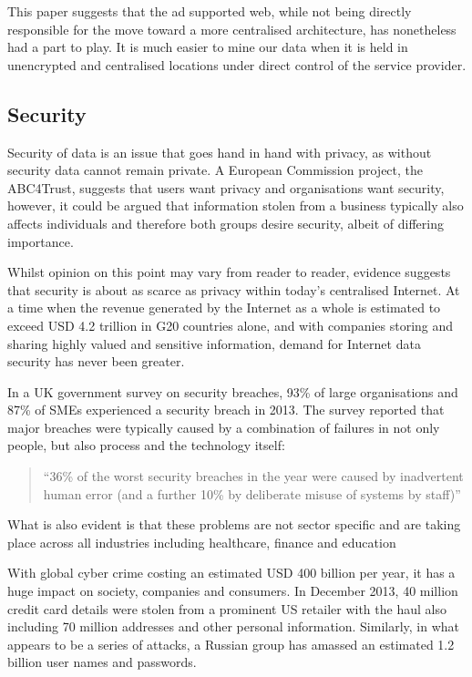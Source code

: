 \documentclass[twocolumn,english]{article}
\begin{document}
This paper suggests that the ad supported web, while not being directly
responsible for the move toward a more centralised architecture, has
nonetheless had a part to play. It is much easier to mine our data
when it is held in unencrypted and centralised locations under direct control of the service provider.

 

\subsection{Security}

Security of data is an issue that goes hand in hand with privacy,
as without security data cannot remain private. A European Commission
project, the ABC4Trust, suggests that users want privacy and organisations
want security, however, it could be argued that information stolen
from a business typically also affects individuals and therefore both
groups desire security, albeit of differing importance\cite{euABC4Trust}.

Whilst opinion on this point may vary from reader to reader, evidence
suggests that security is about as scarce as privacy within today\textquoteright s
centralised Internet. At a time when the revenue generated by the
Internet as a whole is estimated to exceed USD 4.2 trillion in G20 countries
alone, and with companies storing and sharing highly valued and sensitive
information, demand for Internet data security has never been greater\cite{bcg12}. %

In a UK government survey on security breaches, 93\% of large organisations
and 87\% of SMEs experienced a security breach in
2013. The survey reported that major breaches were typically caused
by a combination of failures in not only people, but also process
and the technology itself\cite{ukgov13}:
\begin{quote}
\textquotedblleft 36\% of the worst security breaches in the year
were caused by inadvertent human error (and a further 10\% by deliberate
misuse of systems by staff)\textquotedblright{} 
\end{quote}
What is also evident is that these problems are not sector specific
and are taking place across all industries including healthcare, finance
and education\cite{symantec14}

With global cyber crime costing an estimated USD 400 billion per year,
it has a huge impact on society, companies and consumers\cite{mcafee14}. In December 2013, 40 million credit card details were stolen from
a prominent US retailer with the haul also including 70 million addresses
and other personal information. Similarly, in what appears to be a
series of attacks, a Russian group has amassed an estimated 1.2 billion
user names and passwords\cite{nyt14}.
\end{document}
